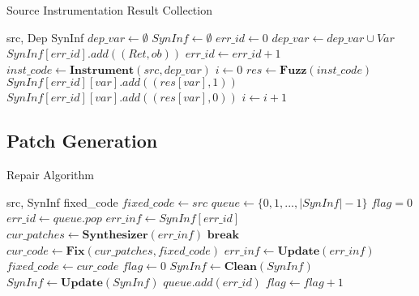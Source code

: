 \documentclass[a4j,dvipdfmx]{article}
\begin{document}
 \begin{algorithm}
 \caption{Source Instrumentation Result Collection}
 \label{srcinst}
 \begin{algorithmic}[1]
 \renewcommand{\algorithmicrequire}{\textbf{Input:}}
 \renewcommand{\algorithmicensure}{\textbf{Output:}}
 \REQUIRE src, Dep
 \ENSURE  SynInf
  \STATE $dep\_var \gets \emptyset$
  \STATE $SynInf \gets \emptyset$
  \STATE $err\_id \gets 0$
   \STATE $dep\_var \gets dep\_var \cup Var$
   \STATE $SynInf[err\_id].add((Ret,ob))$
   \STATE $err\_id \gets err\_id + 1$
  \ENDFOR
  \STATE $inst\_code \gets \textbf{Instrument}(src, dep\_var)$
  \STATE $i \gets 0$
   \STATE $res \gets \textbf{Fuzz}(inst\_code)$
      \STATE $SynInf[err\_id][var].add((res[var],1))$
     \ELSE
      \STATE $SynInf[err\_id][var].add((res[var],0))$
     \ENDIF
     \ENDFOR
    \ENDFOR
   \STATE $i\gets i + 1$
  \ENDWHILE
 \end{algorithmic} 
 \end{algorithm}

\subsection{Patch Generation}
\label{patchgeneration}

 \begin{algorithm}
 \caption{Repair Algorithm}
 \label{repalgo}
 \begin{algorithmic}[1]
 \renewcommand{\algorithmicrequire}{\textbf{Input:}}
 \renewcommand{\algorithmicensure}{\textbf{Output:}}
 \REQUIRE src, SynInf
 \ENSURE  fixed\_code
  \STATE $fixed\_code \gets src$
  \STATE $queue \gets \{0,1,...,|SynInf|-1\}$
  \STATE $flag = 0$
   \STATE $err\_id \gets queue.pop$
   \STATE $err\_inf \gets SynInf[err\_id]$
   \REPEAT
    \STATE $cur\_patches \gets \textbf{Synthesizer}(err\_inf)$
     \STATE $\textbf{break}$
    \ENDIF
    \STATE $cur\_code \gets \textbf{Fix}(cur\_patches,fixed\_code)$
     \STATE $err\_inf \gets \textbf{Update}(err\_inf)$
    \ENDIF
    \STATE $fixed\_code \gets cur\_code$
    \STATE $flag \gets 0$
     \STATE $SynInf \gets \textbf{Clean}(SynInf)$
     \STATE $SynInf \gets \textbf{Update}(SynInf)$
    \ENDIF
   \ELSE
    \STATE $queue.add(err\_id)$
    \STATE $flag \gets flag + 1$
   \ENDIF
  \ENDWHILE  
 \end{algorithmic} 
 \end{algorithm}
\end{document}
